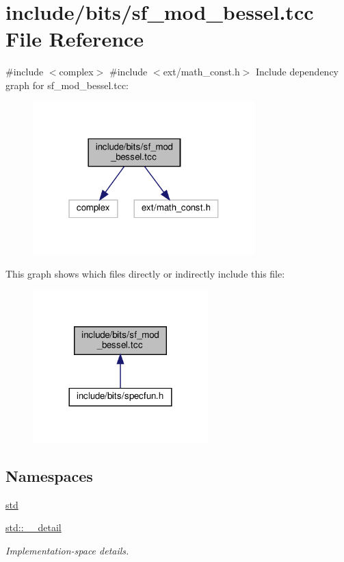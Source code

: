 \hypertarget{sf__mod__bessel_8tcc}{}\section{include/bits/sf\+\_\+mod\+\_\+bessel.tcc File Reference}
\label{sf__mod__bessel_8tcc}
{\ttfamily \#include $<$complex$>$}\newline
{\ttfamily \#include $<$ext/math\+\_\+const.\+h$>$}\newline
Include dependency graph for sf\+\_\+mod\+\_\+bessel.\+tcc\+:
\nopagebreak
\begin{figure}[H]
\begin{center}
\leavevmode
\includegraphics[width=244pt]{sf__mod__bessel_8tcc__incl}
\end{center}
\end{figure}
This graph shows which files directly or indirectly include this file\+:
\nopagebreak
\begin{figure}[H]
\begin{center}
\leavevmode
\includegraphics[width=192pt]{sf__mod__bessel_8tcc__dep__incl}
\end{center}
\end{figure}
\subsection*{Namespaces}
\begin{DoxyCompactItemize}
\item 
 \hyperlink{namespacestd}{std}
\item 
 \hyperlink{namespacestd_1_1____detail}{std\+::\+\_\+\+\_\+detail}
\begin{DoxyCompactList}\small\item\em Implementation-\/space details. \end{DoxyCompactList}\end{DoxyCompactItemize}
